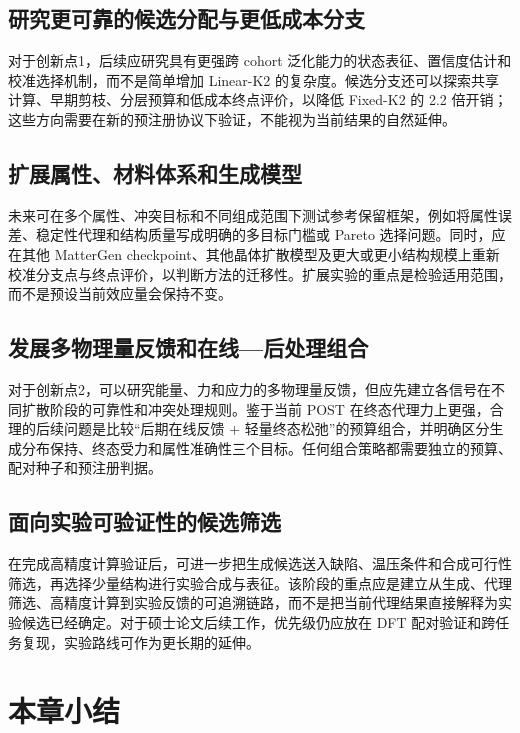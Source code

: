 \subsection{研究更可靠的候选分配与更低成本分支}

对于创新点1，后续应研究具有更强跨 cohort 泛化能力的状态表征、置信度估计和校准选择机制，而不是简单增加 Linear-K2 的复杂度。候选分支还可以探索共享计算、早期剪枝、分层预算和低成本终点评价，以降低 Fixed-K2 的 2.2 倍开销；这些方向需要在新的预注册协议下验证，不能视为当前结果的自然延伸。

\subsection{扩展属性、材料体系和生成模型}

未来可在多个属性、冲突目标和不同组成范围下测试参考保留框架，例如将属性误差、稳定性代理和结构质量写成明确的多目标门槛或 Pareto 选择问题。同时，应在其他 MatterGen checkpoint、其他晶体扩散模型及更大或更小结构规模上重新校准分支点与终点评价，以判断方法的迁移性。扩展实验的重点是检验适用范围，而不是预设当前效应量会保持不变。

\subsection{发展多物理量反馈和在线---后处理组合}

对于创新点2，可以研究能量、力和应力的多物理量反馈，但应先建立各信号在不同扩散阶段的可靠性和冲突处理规则。鉴于当前 POST 在终态代理力上更强，合理的后续问题是比较``后期在线反馈 + 轻量终态松弛''的预算组合，并明确区分生成分布保持、终态受力和属性准确性三个目标。任何组合策略都需要独立的预算、配对种子和预注册判据。

\subsection{面向实验可验证性的候选筛选}

在完成高精度计算验证后，可进一步把生成候选送入缺陷、温压条件和合成可行性筛选，再选择少量结构进行实验合成与表征。该阶段的重点应是建立从生成、代理筛选、高精度计算到实验反馈的可追溯链路，而不是把当前代理结果直接解释为实验候选已经确定。对于硕士论文后续工作，优先级仍应放在 DFT 配对验证和跨任务复现，实验路线可作为更长期的延伸。

\section{本章小结}

